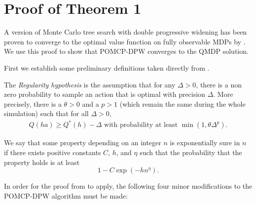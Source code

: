 \chapter{Proof of Theorem 1} \label{sec:proof}

A version of Monte Carlo tree search with double progressive widening has been proven to converge to the optimal value function on fully observable MDPs by \citet{auger2013continuous}.
We use this proof to show that POMCP-DPW converges to the QMDP solution.

First we establish some preliminary definitions taken directly from \citet{auger2013continuous}.

\begin{definition}
    The \emph{Regularity hypothesis} is the assumption that for any $\Delta > 0$, there is a non zero probability to sample an action that is optimal with precision $\Delta$. More precisely, there is a $\theta > 0$ and a $p > 1$ (which remain the same during the whole simulation) such that for all $\Delta > 0$, 
\begin{align}
    Q(ha) \geq Q^*(h)-\Delta \text{ with probability at least } \min(1, \theta \Delta^p)\text{.}
\end{align}
\end{definition}

\begin{definition}
    We say that some property depending on an integer $n$ is exponentially sure in $n$ if there exists positive constants $C$, $h$, and $\eta$ such that the probability that the property holds is at least $$1-C \exp(-hn^\eta)\text{.}$$
\end{definition}

In order for the proof from \citet{auger2013continuous} to apply, the following four minor modifications to the POMCP-DPW algorithm must be made: 

